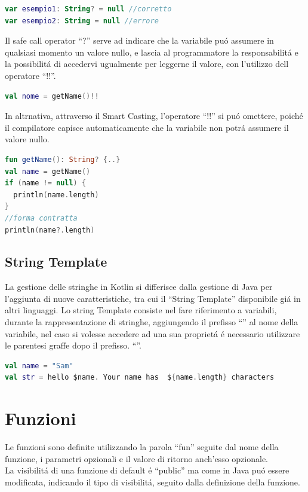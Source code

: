 \begin{lstlisting}[language=kotlin,caption={Esempio 1 Safe call operator Kotlin}]
var esempio1: String? = null //corretto
var esempio2: String = null //errore
\end{lstlisting}

Il safe call operator ``?'' serve ad indicare che la variabile pu\'o assumere in qualsiasi momento un valore nullo, e lascia al programmatore la responsabilit\'a e la possibilit\'a di accedervi ugualmente per leggerne il valore, con l'utilizzo dell operatore ``!!''.


\begin{lstlisting}[language=kotlin,caption={Esempio 2 Safe call operator Kotlin}]
val nome = getName()!!
\end{lstlisting}

In altrnativa, attraverso il Smart Casting, l'operatore ``!!'' si pu\'o omettere, poich\'e il compilatore capisce automaticamente che la variabile non potr\'a assumere il valore nullo.

\begin{lstlisting}[language=kotlin,caption={Smart Casting in Kotlin}]
fun getName(): String? {..}
val name = getName()
if (name != null) {
  println(name.length)
}
//forma contratta
println(name?.length)
\end{lstlisting}

\subsection{String Template}
La gestione delle stringhe in Kotlin si differisce dalla gestione di Java per l'aggiunta di nuove caratteristiche, tra cui il ``String Template'' disponibile gi\'a in altri linguaggi.
Lo string Template consiste nel fare riferimento a variabili, durante la rappresentazione di stringhe, aggiungendo il prefisso  ``\textdollar'' al nome della variabile, nel caso si volesse accedere ad una sua propriet\'a \'e necessario utilizzare le parentesi graffe dopo il prefisso. ``\textdollar''.


\begin{lstlisting}[language=kotlin,caption={Esempio String template Kotlin}]
val name = "Sam"
val str = hello $name. Your name has  ${name.length} characters
\end{lstlisting}


\section{Funzioni}
Le funzioni sono definite utilizzando la parola ``fun'' seguite dal nome della funzione, i parametri opzionali e il valore di ritorno anch'esso opzionale.\\
La visibilit\'a di una funzione di default \'e ``public'' ma come in Java pu\'o essere modificata, indicando il tipo di visibilit\'a, seguito dalla definizione della funzione.

